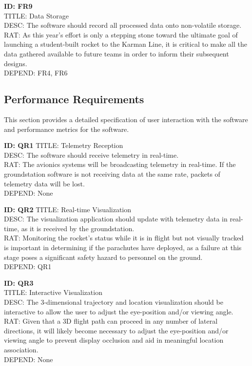 \documentclass[onecolumn, draftclsnofoot,10pt, compsoc]{IEEEtran}
\begin{document}
			\noindent
			\textbf{ID: FR9}\\
			TITLE: Data Storage\\
			DESC: The software should record all processed data onto non-volatile storage.\\
			RAT: As this year's effort is only a stepping stone toward the ultimate goal of launching a student-built rocket to the Karman Line, it is critical to make all the data gathered available to future teams in order to inform their subsequent designs.\\
			DEPEND: FR4, FR6
		
		\subsection{Performance Requirements}
			This section provides a detailed specification of user interaction with the software and performance metrics for the software.
		
			\noindent
			\textbf{ID: QR1}
			TITLE: Telemetry Reception\\
			DESC: The software should receive telemetry in real-time.\\
			RAT: The avionics systems will be broadcasting telemetry in real-time. 
				If the groundstation software is not receiving data at the same rate, packets of telemetry data will be lost.\\
			DEPEND: None
			
			\noindent
			\textbf{ID: QR2}
			TITLE: Real-time Visualization\\
			DESC: The visualization application should update with telemetry data in real-time, as it is received by the groundstation.\\
			RAT: Monitoring the rocket's status while it is in flight but not visually tracked is important in determining if the parachutes have deployed, as a failure at this stage poses a significant safety hazard to personnel on the ground. \\
			DEPEND: QR1
			
			\noindent
			\textbf{ID: QR3}\\
			TITLE: Interactive Visualization\\
			DESC: The 3-dimensional trajectory and location visualization should be interactive to allow the user to adjust the eye-position and/or viewing angle.\\
			RAT: Given that a 3D flight path can proceed in any number of lateral directions, it will likely become necessary to adjust the eye-position and/or viewing angle to prevent display occlusion and aid in meaningful location association.\\
			DEPEND: None
			
\end{document}
